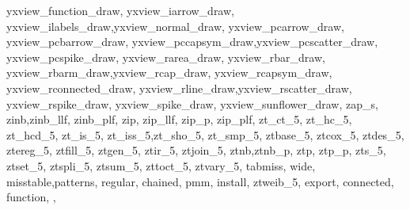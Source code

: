 {{yxview_function_draw, yxview_iarrow_draw, yxview_ilabels_draw,yxview_normal_draw, yxview_pcarrow_draw, yxview_pcbarrow_draw, yxview_pccapsym_draw,yxview_pcscatter_draw, yxview_pcspike_draw, yxview_rarea_draw, yxview_rbar_draw, yxview_rbarm_draw,yxview_rcap_draw, yxview_rcapsym_draw, yxview_rconnected_draw, yxview_rline_draw,yxview_rscatter_draw, yxview_rspike_draw, yxview_spike_draw, yxview_sunflower_draw, zap_s, zinb,zinb_llf, zinb_plf, zip, zip_llf, zip_p, zip_plf, zt_ct_5, zt_hc_5, zt_hcd_5, zt_is_5, zt_iss_5,zt_sho_5, zt_smp_5, ztbase_5, ztcox_5, ztdes_5, ztereg_5, ztfill_5, ztgen_5, ztir_5, ztjoin_5, ztnb,ztnb_p, ztp, ztp_p, zts_5, ztset_5, ztspli_5, ztsum_5, zttoct_5, ztvary_5, tabmiss, wide, misstable,patterns, regular, chained, pmm, install, ztweib_5, export, connected, function,
	},
}

